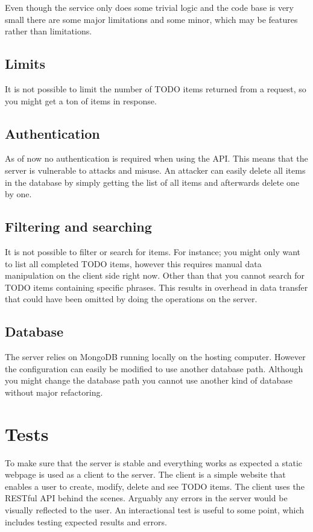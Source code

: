 \documentclass[a4paper,danish]{dnacm} %
\begin{document}
Even though the service only does some trivial logic and the code base is very small there are some major limitations and some minor, which may be features rather than limitations. 

\subsection{Limits}

It is not possible to limit the number of TODO items returned from a request, so you might get a ton of items in response. 

\subsection{Authentication}

As of now no authentication is required when using the API. This means that the server is vulnerable to attacks and misuse. An attacker can easily delete all items in the database by simply getting the list of all items and afterwards delete one by one.

\subsection{Filtering and searching}

It is not possible to filter or search for items. For instance; you might only want to list all completed TODO items, however this requires manual data manipulation on the client side right now. Other than that you cannot search for TODO items containing specific phrases. This results in overhead in data transfer that could have been omitted by doing the operations on the server.  

\subsection{Database}

The server relies on MongoDB running locally on the hosting computer. However the configuration can easily be modified to use another database path. Although you might change the database path you cannot use another kind of database without major refactoring.

\section{Tests}

To make sure that the server is stable and everything works as expected a static webpage is used as a client to the server. The client is a simple website that enables a user to create, modify, delete and see TODO items. The client uses the RESTful API behind the scenes. Arguably any errors in the server would be visually reflected to the user. An interactional test is useful to some point, which includes testing expected results and errors. 
\end{document}
